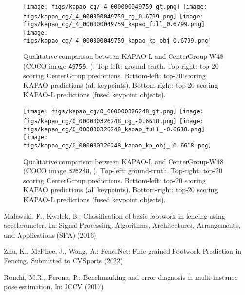 \documentclass[runningheads]{llncs}
\begin{document}
\begin{figure}[t!]
\centering
    \texttt{[image: figs/kapao\_cg/\_4\_000000049759\_gt.png]}
    \texttt{[image: figs/kapao\_cg/\_4\_000000049759\_cg\_0.6799.png]}
    \texttt{[image: figs/kapao\_cg/\_4\_000000049759\_kapao\_full\_0.6799.png]}
    \texttt{[image: figs/kapao\_cg/\_4\_000000049759\_kapao\_kp\_obj\_0.6799.png]}
\caption[Qualitative comparison between KAPAO-L and CenterGroup-W48 (COCO image \texttt{49759}).]{Qualitative comparison between KAPAO-L and CenterGroup-W48 (COCO image \texttt{49759}, ). Top-left: ground-truth. Top-right: top-20 scoring CenterGroup predictions. Bottom-left: top-20 scoring KAPAO predictions (all keypoints). Bottom-right: top-20 scoring KAPAO-L predictions (fused keypoint objects).}
\label{fig:kapao_qualitative_pos}
\end{figure}

\begin{figure}[t!]
\centering
    \texttt{[image: figs/kapao\_cg/0\_000000326248\_gt.png]}
    \texttt{[image: figs/kapao\_cg/0\_000000326248\_cg\_-0.6618.png]}
    \texttt{[image: figs/kapao\_cg/0\_000000326248\_kapao\_full\_-0.6618.png]}
    \texttt{[image: figs/kapao\_cg/0\_000000326248\_kapao\_kp\_obj\_-0.6618.png]}
\caption[Qualitative comparison between KAPAO-L and CenterGroup-W48 (COCO image \texttt{326248}).]{Qualitative comparison between KAPAO-L and CenterGroup-W48 (COCO image \texttt{326248}, ). Top-left: ground-truth. Top-right: top-20 scoring CenterGroup predictions. Bottom-left: top-20 scoring KAPAO predictions (all keypoints). Bottom-right: top-20 scoring KAPAO-L predictions (fused keypoint objects).}
\label{fig:kapao_qualitative_neg}
\end{figure}

\begin{thebibliography}{2}
Malawski, F., Kwolek, B.: Classification of basic footwork in fencing using accelerometer. In: Signal Processing: Algorithms, Architectures, Arrangements, and
Applications (SPA) (2016)

Zhu, K., McPhee, J., Wong, A.: FenceNet: Fine-grained Footwork Prediction in Fencing. Submitted to CVSports (2022)

Ronchi, M.R., Perona, P.: Benchmarking and error diagnosis in multi-instance pose estimation. In: ICCV (2017)
\end{thebibliography}
\end{document}
